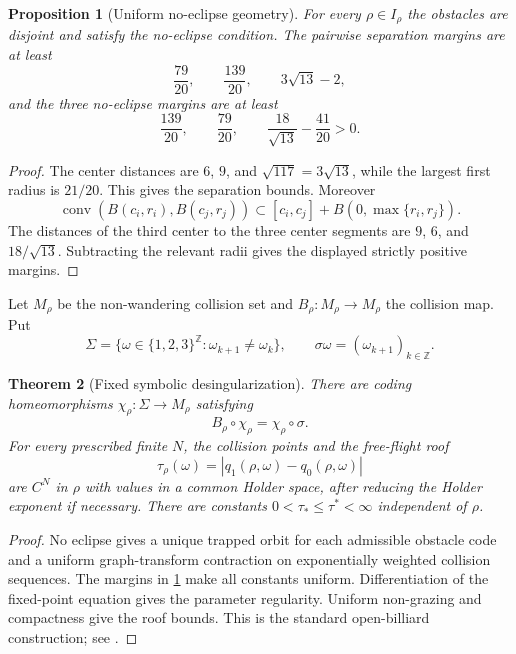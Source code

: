 \documentclass[11pt,reqno]{amsart}
\newtheorem{theorem}{Theorem}[section]
\newtheorem{proposition}[theorem]{Proposition}
\theoremstyle{definition}
\theoremstyle{remark}
\newcommand{\abs}[1]{\left\lvert #1\right\rvert}
\begin{document}
\begin{proposition}[Uniform no-eclipse geometry]\label{prop:no-eclipse}
For every $\rho\in I_\rho$ the obstacles are disjoint and satisfy the
no-eclipse condition.  The pairwise separation margins are at least
\[
 \frac{79}{20},\qquad \frac{139}{20},\qquad 3\sqrt{13}-2,
\]
and the three no-eclipse margins are at least
\[
 \frac{139}{20},\qquad \frac{79}{20},\qquad
 \frac{18}{\sqrt{13}}-\frac{41}{20}>0.
\]
\end{proposition}
\begin{proof}
The center distances are $6$, $9$, and $\sqrt{117}=3\sqrt{13}$, while the
largest first radius is $21/20$.  This gives the separation bounds.  Moreover
\[
 \operatorname{conv}(B(c_i,r_i),B(c_j,r_j))
 \subset[c_i,c_j]+B(0,\max\{r_i,r_j\}).
\]
The distances of the third center to the three center segments are $9$, $6$,
and $18/\sqrt{13}$.  Subtracting the relevant radii gives the displayed
strictly positive margins.
\end{proof}

Let $M_\rho$ be the non-wandering collision set and $B_\rho:M_\rho\to M_\rho$
the collision map.  Put
\[
 \Sigma=\{\omega\in\{1,2,3\}^{\mathbb Z}:\omega_{k+1}\ne\omega_k\},
 \qquad \sigma\omega=(\omega_{k+1})_{k\in\mathbb Z}.
\]

\begin{theorem}[Fixed symbolic desingularization]\label{thm:coding}
There are coding homeomorphisms $\chi_\rho:\Sigma\to M_\rho$ satisfying
\[
 B_\rho\circ\chi_\rho=\chi_\rho\circ\sigma.
\]
For every prescribed finite $N$, the collision points and the free-flight roof
\[
 \tau_\rho(\omega)
 =\abs{q_1(\rho,\omega)-q_0(\rho,\omega)}
\]
are $C^N$ in $\rho$ with values in a common Holder space, after reducing the
Holder exponent if necessary.  There are constants
$0<\tau_*\le\tau^*<\infty$ independent of $\rho$.
\end{theorem}
\begin{proof}
No eclipse gives a unique trapped orbit for each admissible obstacle code and
a uniform graph-transform contraction on exponentially weighted collision
sequences.  The margins in \cref{prop:no-eclipse} make all constants uniform.
Differentiation of the fixed-point equation gives the parameter regularity.
Uniform non-grazing and compactness give the roof bounds.  This is the standard
open-billiard construction; see \cite{ChernovMarkarian2006,Wright2016}.
\end{proof}
\end{document}
